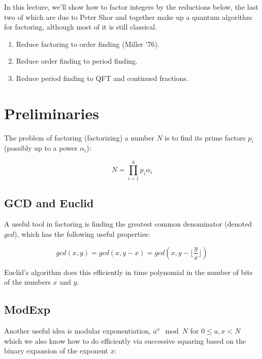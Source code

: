 \documentclass[12pt]{article}
\begin{document}
\MakeScribeTop

\newcommand{\ket}[1]{|#1 \rangle}
\newcommand{\bra}[1]{\langle #1 |}

In this lecture, we'll show how to factor integers by the reductions below,
the last two of which are due to Peter Shor and together make up a quantum
algorithm for factoring, although most of it is still classical.

\begin{enumerate}
\item Reduce factoring to order finding (Miller '76).
\item Reduce order finding to period finding.
\item Reduce period finding to QFT and continued fractions.
\end{enumerate}

\section{Preliminaries}

The problem of factoring (factorizing) a number $N$ is to find its prime factors
$p_i$ (possibly up to a power $\alpha_i$):

\begin{displaymath}
N = \prod_{i=1}^k p_i{\alpha_i}
\end{displaymath}

\subsection{GCD and Euclid}

A useful tool in factoring is finding the greatest common denominator
(denoted $gcd$), which has the following useful properties:

\begin{displaymath}
gcd(x,y) = gcd(x, y-x) = gcd(x, y - \lfloor \frac{y}{x} \rfloor)
\end{displaymath}

Euclid's algorithm does this efficiently in time polynomial in the number
of bits of the numbers $x$ and $y$.

\subsection{ModExp}

Another useful idea is modular exponentiation, $a^x \mod N$ for
$0 \le a,x < N$ which we also know how to do efficiently via successive
squaring based on the binary expansion of the exponent $x$:
\end{document}
